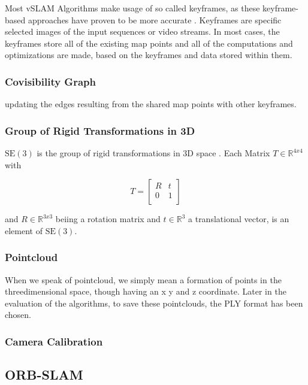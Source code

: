 		Most vSLAM Algorithms make usage of so called keyframes, as these keyframe-based approaches have proven to be more accurate \cite{keyframe}.
		Keyframes are specific selected images of the input sequences or video streams. In most cases, the keyframes store all of the existing 
		map points and all of the computations and optimizations are made, based on the keyframes and data stored within them. 
	
		\subsubsection{Covisibility Graph}
		
		updating the edges resulting from the shared map
		points with other keyframes.
		
		\subsubsection{Group of Rigid Transformations in 3D}
		
		$\text{SE}(3)$ is the group of rigid transformations in 3D space \cite{se3}. Each Matrix $ T \in \mathbb{R}^{4x4}$ with 
		
		$$ T = \left[
		\begin{array}{rrr}
		R &  t \\  
		0  & 1 \\ 
		\end{array} \right]$$
		
		and $ R \in \mathbb{R}^{3x3}$ beiing a rotation matrix and $ t \in \mathbb{R}^{3}$ a translational vector, is an element of $\text{SE}(3)$.
		
		
		\subsubsection{Pointcloud}
		
		When we speak of pointcloud, we simply mean a formation of points in the threedimensional space, though having
		an x y and z coordinate. Later in the evaluation of the algorithms, to save these pointclouds, the PLY format has 
		been chosen. 
		
		\subsubsection{Camera Calibration}

	\subsection{ORB-SLAM}
	
